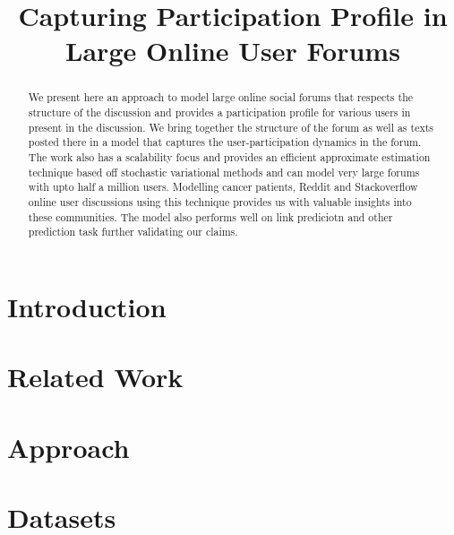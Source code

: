 \documentclass{article}
\title{Capturing Participation Profile in Large Online User Forums}
\newcommand{\comment}[1]{{\color{red}{#1}}}
\begin{document}
\maketitle
\begin{abstract}
We present here an approach to model large online social forums that respects
the structure of the discussion and provides a participation profile for
various users in present in the discussion. We bring together the structure of 
the forum as well as texts posted there
in a model that captures the user-participation dynamics in the forum. 
The work also has a scalability focus and provides an efficient approximate
estimation technique based off stochastic variational methods and can
model very large forums with upto half a million users.
Modelling cancer patients, Reddit and Stackoverflow online user discussions 
using this technique provides us with valuable insights into these
communities. The model also performs well on link prediciotn and other
prediction task further validating our claims.
\comment{We should make it more strongly worded in our favor if the cancer
forum task works well}
\end{abstract}

\section{Introduction}


\section{Related Work}


\section{Approach}


\section{Datasets}

% 
% 
% 
\end{document}
